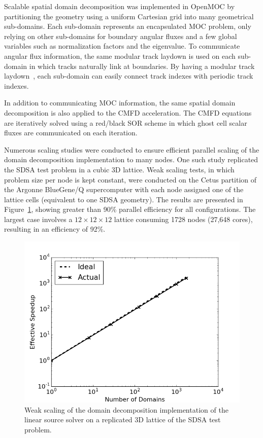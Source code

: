 \documentclass[12pt,twoside]{mitthesis-exec}
\begin{document}
Scalable spatial domain decomposition was implemented in OpenMOC by partitioning the geometry using a uniform Cartesian grid into many geometrical sub-domains. Each sub-domain represents an encapsulated MOC problem, only relying on other sub-domains for boundary angular fluxes and a few global variables such as normalization factors and the eigenvalue. To communicate angular flux information, the same modular track laydown is used on each sub-domain in which tracks naturally link at boundaries. By having a modular track laydown~\cite{liu_mrt}, each sub-domain can easily connect track indexes with periodic track indexes.

In addition to communicating MOC information, the same spatial domain decomposition is also applied to the CMFD acceleration. The CMFD equations are iteratively solved using a red/black SOR scheme in which ghost cell scalar fluxes are communicated on each iteration.

Numerous scaling studies were conducted to ensure efficient parallel scaling of the domain decomposition implementation to many nodes. One such study replicated the SDSA test problem in a cubic 3D lattice. Weak scaling tests, in which problem size per node is kept constant, were conducted on the Cetus partition of the Argonne BlueGene/Q supercomputer with each node assigned one of the lattice cells (equivalent to one SDSA geometry). The results are presented in Figure~\ref{fig:dd-ws-3D-eff}, showing greater than 90\% parallel efficiency for all configurations. The largest case involves a $12 \times 12 \times 12$ lattice consuming 1728 nodes (27,648 cores), resulting in an efficiency of 92\%.
	
\begin{figure}[h!]
	\centering
	\includegraphics[width=0.75\linewidth]{figures/DD/dd-ws-3D-eff.png}
	\caption[]{Weak scaling of the domain decomposition implementation of the linear source solver on a replicated 3D lattice of the SDSA test problem.}
	\label{fig:dd-ws-3D-eff}
\end{figure}
\end{document}

